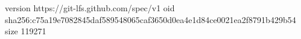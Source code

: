 version https://git-lfs.github.com/spec/v1
oid sha256:c75a19e7082845daf589548065caf3650d0ea4e1d84ce0021ea2f8791b429b54
size 119271
